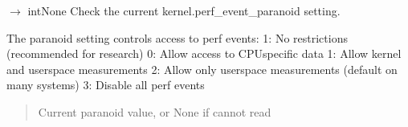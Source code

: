 \documentclass[letterpaper,10pt,english]{sphinxmanual}
\begin{document}
\begin{fulllineitems}

\begin{fulllineitems}
\label{\detokenize{core.readers.perf_reader:core.readers.perf_reader.PerfReader.PERF_LINE_PATTERN}}
\pysigstartsignatures
\pysigline
{}
\pysigstopsignatures
\end{fulllineitems}


\begin{fulllineitems}
\label{\detokenize{core.readers.perf_reader:core.readers.perf_reader.PerfReader.check_paranoid_setting}}
\pysigstartsignatures
\pysiglinewithargsret
{}
{}
{{ $\rightarrow$ intNone}}
\pysigstopsignatures
\sphinxAtStartPar
Check the current kernel.perf\_event\_paranoid setting.

\sphinxAtStartPar
The paranoid setting controls access to perf events:
\sphinxhyphen{} \sphinxhyphen{}1: No restrictions (recommended for research)
\sphinxhyphen{} 0: Allow access to CPU\sphinxhyphen{}specific data
\sphinxhyphen{} 1: Allow kernel and user\sphinxhyphen{}space measurements
\sphinxhyphen{} 2: Allow only user\sphinxhyphen{}space measurements (default on many systems)
\sphinxhyphen{} 3: Disable all perf events
\begin{quote}\begin{description}
\sphinxAtStartPar
Current paranoid value, or None if cannot read

\end{description}\end{quote}

\end{fulllineitems}


\end{fulllineitems}
\end{document}
